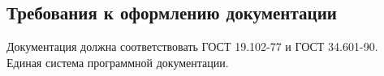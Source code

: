 \subsection{Требования к оформлению документации}

Документация должна соответствовать ГОСТ 19.102-77 и ГОСТ 34.601-90. Единая система программной документации.